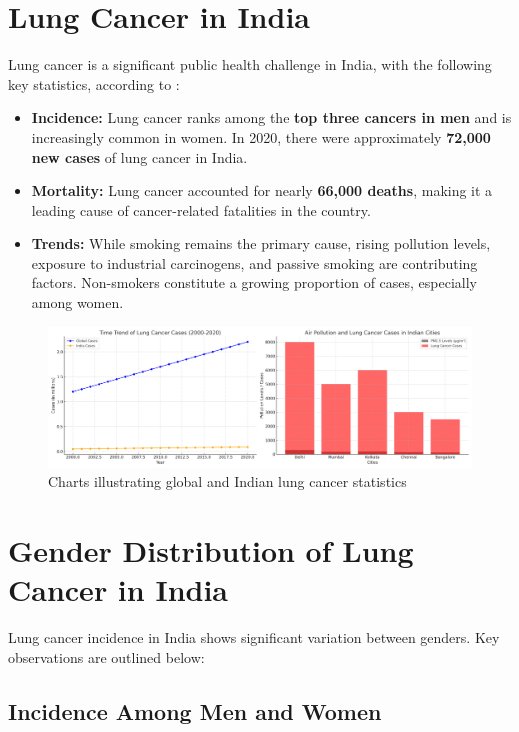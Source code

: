 \section{Lung Cancer in India}
Lung cancer is a significant public health challenge in India, with the following key statistics, according to \cite{singh2021lung}:
\begin{itemize}
    \item \textbf{Incidence:} Lung cancer ranks among the \textbf{top three cancers in men} and is increasingly common in women. In 2020, there were approximately \textbf{72,000 new cases} of lung cancer in India.
    \item \textbf{Mortality:} Lung cancer accounted for nearly \textbf{66,000 deaths}, making it a leading cause of cancer-related fatalities in the country.
    \item \textbf{Trends:} While smoking remains the primary cause, rising pollution levels, exposure to industrial carcinogens, and passive smoking are contributing factors. Non-smokers constitute a growing proportion of cases, especially among women.
\end{itemize}
\begin{figure}[h!]
    \centering
    \includegraphics[width=\textwidth]{images/lung_cancer_additional_charts.png}
    \caption{Charts illustrating global and Indian lung cancer statistics}
    \label{fig:lung_stats_2}
\end{figure}
\section{Gender Distribution of Lung Cancer in India}

Lung cancer incidence in India shows significant variation between genders. Key observations are outlined below:

\subsection{Incidence Among Men and Women}

